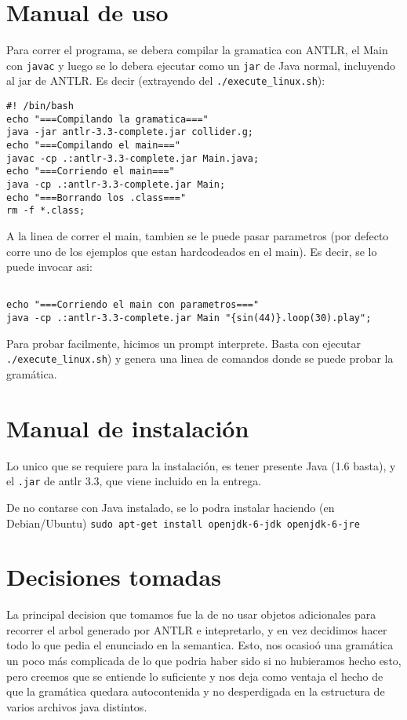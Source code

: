 \documentclass[a4paper]{article}
\begin{document}
\section{Manual de uso}
Para correr el programa, se debera compilar la gramatica con ANTLR, el Main con \texttt{javac} y luego
se lo debera ejecutar como un \texttt{jar}  de Java normal, incluyendo al jar de ANTLR. Es decir (extrayendo del
\texttt{./execute\_linux.sh}): 
\begin{verbatim}
#! /bin/bash
echo "===Compilando la gramatica==="
java -jar antlr-3.3-complete.jar collider.g;
echo "===Compilando el main==="
javac -cp .:antlr-3.3-complete.jar Main.java;
echo "===Corriendo el main==="
java -cp .:antlr-3.3-complete.jar Main;
echo "===Borrando los .class==="
rm -f *.class;
\end{verbatim}
A la linea de correr el main, tambien se le puede pasar parametros (por 
defecto corre uno de los ejemplos que estan hardcodeados en el main). 
Es decir, se lo puede invocar asi:
\begin{verbatim}

echo "===Corriendo el main con parametros==="
java -cp .:antlr-3.3-complete.jar Main "{sin(44)}.loop(30).play";
\end{verbatim}

Para probar facilmente, hicimos un prompt interprete. Basta con ejecutar
\texttt{./execute\_linux.sh}) y genera una linea de comandos donde se puede probar la gram\'atica.

\section{Manual de instalaci\'on}
Lo unico que se requiere para la instalaci\'on, es tener presente Java (1.6 basta),
y el \texttt{.jar} de antlr 3.3, que viene incluido en la entrega.

De no contarse con Java instalado, se lo podra instalar haciendo (en Debian/Ubuntu)
\hbox{\texttt{sudo apt-get install openjdk-6-jdk openjdk-6-jre }}

\section{Decisiones tomadas}
La principal decision que tomamos fue la de no usar objetos adicionales para
recorrer el arbol generado por ANTLR e intepretarlo, y en vez decidimos hacer
todo lo que pedia el enunciado en la semantica. Esto, nos ocasio\'o una gram\'atica
un poco m\'as complicada de lo que podria haber sido si no hubieramos hecho esto,
pero creemos que se entiende lo suficiente y nos deja como ventaja el hecho
de que la gram\'atica quedara autocontenida y no desperdigada en la estructura
de varios archivos java distintos.
\end{document}
